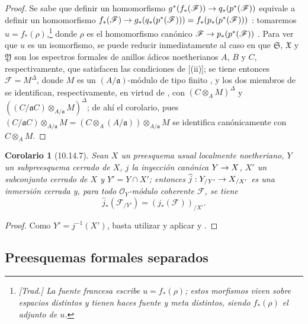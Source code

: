\documentclass[oneside]{amsart}
\theoremstyle{ega-env-style}
\theoremstyle{ega-thm-env-style}
\newtheorem*{corollary}{Corolario}
\theoremstyle{ega-defn-env-style}
\renewcommand{\to}{\mathchoice{\longrightarrow}{\rightarrow}{\rightarrow}{\rightarrow}}
\newcommand{\oldpage}[2][]{{\marginnote{\normalfont{\textbf{#1}~|~#2}}}\ignorespaces}
\let\EGAOriginalLabel\label
\renewcommand{\label}[1]{\phantomsection\EGAOriginalLabel{#1}}
\begin{document}
\begin{proof}
Se sabe que definir un homomorfismo $g^*(f_*(\mathscr{F}))\to q_*(p^*(\mathscr{F}))$ equivale a definir un homomorfismo $f_*(\mathscr{F})\to g_*(q_*(p^*(\mathscr{F})))
=f_*(p_*(p^*(\mathscr{F})))$ :
tomaremos $u=f_*(\rho)$,\footnote{\emph{[Trad.] La fuente francesa escribe $u=f_*(\rho)$; estos morfismos viven sobre espacios distintos y tienen haces fuente y meta distintos, siendo $f_*(\rho)$ el adjunto de $u$.}} donde $\rho$ es el homomorfismo canónico $\mathscr{F}\to p_*(p^*(\mathscr{F}))$ .
Para ver que $u$ es un isomorfismo, se puede reducir inmediatamente al caso en que $\mathfrak{S}$, $\mathfrak{X}$ y $\mathfrak{Y}$ son los espectros formales de anillos ádicos noetherianos $A$, $B$ y $C$, respectivamente, que satisfacen las condiciones de [(ii)];
se tiene entonces $\mathscr{F}=M^\Delta$, donde $M$ es un $(A/\mathfrak{a})$-módulo de tipo finito , y los dos miembros de  se identifican, respectivamente, en virtud de , con $(C\otimes_A M)^\Delta$ y $((C/\mathfrak{a}C)\otimes_{A/\mathfrak{a}}M)^\Delta$; de ahí el corolario, pues $(C/\mathfrak{a}C)\otimes_{A/\mathfrak{a}}M
=(C\otimes_A(A/\mathfrak{a}))\otimes_{A/\mathfrak{a}}M$ se identifica canónicamente con $C\otimes_A M$.
\end{proof}

\oldpage[I]{212}
\begin{corollary}[10.14.7]
\label{I.10.14.7}
Sean $X$ un preesquema usual localmente noetheriano, $Y$ un subpreesquema cerrado de $X$, $j$ la inyección canónica $Y\to X$, $X'$ un subconjunto cerrado de $X$ y $Y'=Y\cap X'$;
entonces $\widehat{j}:Y_{/Y'}\to X_{/X'}$ es una inmersión cerrada y, para todo $\mathscr{O}_Y$-módulo coherente $\mathscr{F}$, se tiene
\[
  \widehat{j}_*(\mathscr{F}_{/Y'})=(j_*(\mathscr{F}))_{/X'}.
\]
\end{corollary}

\begin{proof}
Como $Y'=j^{-1}(X')$, basta utilizar  y aplicar  y .
\end{proof}

\subsection{Preesquemas formales separados}
\label{subsection:I.10.15}
\end{document}
